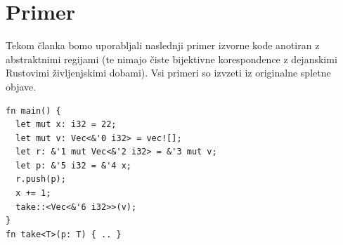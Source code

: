\documentclass[a4paper,12pt,openright]{book}
\begin{document}
\section{Primer}
Tekom članka bomo uporabljali naslednji primer izvorne kode anotiran z abstraktnimi regijami (te nimajo čiste bijektivne korespondence z
dejanskimi Rustovimi življenjskimi dobami). Vsi primeri so izvzeti iz originalne spletne objave.

\begin{listing}[!ht]
	\begin{verbatim}
fn main() {
  let mut x: i32 = 22;
  let mut v: Vec<&'0 i32> = vec![];
  let r: &'1 mut Vec<&'2 i32> = &'3 mut v;
  let p: &'5 i32 = &'4 x;
  r.push(p);
  x += 1;
  take::<Vec<&'6 i32>>(v);
}
fn take<T>(p: T) { .. }
\end{verbatim}
	\caption{Primer programa za Polonius}
	\label{listing:primerPolonius}
\end{listing}

\end{document}
